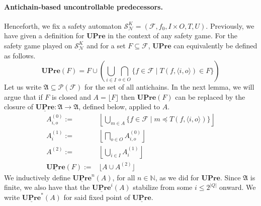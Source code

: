 \documentclass[runningheads,a4paper,draft]{llncs}
\newcommand{\pow}[1]{\mathcal{P}(#1)}
\newcommand{\upre}{\mathbf{UPre}}
\newcommand{\calF}{\mathcal{F}}
\newcommand{\calN}{\mathcal{N}}
\newcommand{\calS}{\mathcal{S}}
\newcommand{\frakA}{\mathfrak{A}}
\begin{document}
\paragraph{Antichain-based uncontrollable predecessors.}
Henceforth, we fix a safety
automaton $\calS^K_\calN = (\calF,f_0,I \times O, T,U)$.  Previously, we have given a
definition for $\upre$ in the context of any safety game. For the safety game
played on $\calS^K_\calN$ and for a set $F \subseteq \calF$, $\upre$ can equivalently be
defined as follows.
\[
  \upre(F) = F \cup \left( \bigcup_{i \in I} \bigcap_{o \in O}
  \{f \in \calF \mid T(f,\langle i, o \rangle) \in F\} \right)
\]
%
Let us write $\frakA \subseteq \pow{\calF}$ for the set of all antichains. In
the next lemma, we will argue that if $F$ is closed and $A = \lfloor F
\rfloor$ then $\upre(F)$ can be
replaced by the closure of $\underline{\upre} \colon \frakA \to \frakA$,
defined below, applied to $A$.
\begin{align*}
  A^{(0)}_{i,o} := {} &
  \left\lfloor \bigcup_{m \in A} \{f \in \calF \mid m \preceq
  T(f,\langle i, o \rangle) \} \right\rfloor\\
  A^{(1)}_{i} := {} &
  \left\lfloor \bigsqcap_{o \in O} A^{(0)}_{i,o} \right\rfloor\\
  A^{(2)} := {} &
  \left\lfloor \bigcup_{i \in I} A^{(1)}_i \right\rfloor\\
  \underline{\upre}(F) := {} &
  \lfloor A \cup A^{(2)} \rfloor
\end{align*}
We inductively define $\underline{\upre}^n(A)$, for all $n \in \mathbb{N}$, as
we did for $\upre$. Since $\frakA$ is finite, we also have that the
$\underline{\upre}^i(A)$ stabilize from some $i \leq 2^{|Q|}$ onward. We write
$\underline{\upre}^*(A)$ for said fixed point of $\underline{\upre}$.
\end{document}
